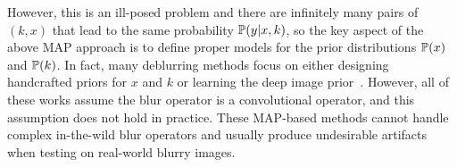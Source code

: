 \documentclass[final]{cvpr}
\newcommand{\Eref}[1]{Eq.~(\ref{#1})}
\begin{document}
However, this is an ill-posed problem and there are infinitely many pairs of $(k, x)$ that lead to the same probability $\mathbb{P}(y|x, k)$, so the key aspect of the above MAP approach is to define proper models for the prior distributions $\mathbb{P}(x)$ and $\mathbb{P}(k)$. In fact, many deblurring methods focus on either designing handcrafted priors for $x$ and $k$ \cite{chan1998total,krishnan2009fast,pan2016blind,liu2014blind} or learning the deep image prior~\cite{ulyanov2018deep, ren2020neural}. However, all of these works assume the blur operator is a convolutional operator, and this assumption does not hold in practice. These MAP-based methods cannot handle complex in-the-wild blur operators and usually produce undesirable artifacts when testing on real-world blurry images.




\end{document}
